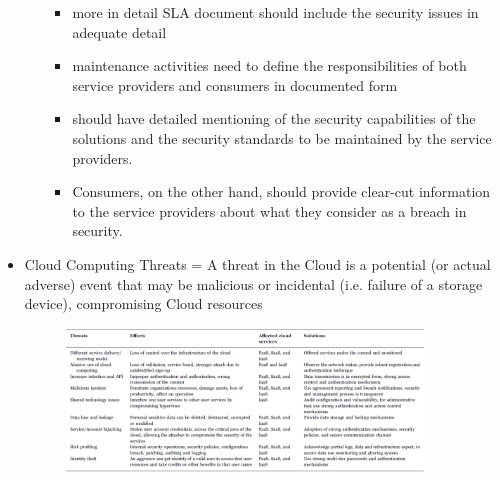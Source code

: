 \documentclass{article}
\begin{document}
\begin{itemize}
\begin{itemize}
        \begin{itemize}
            \item more in detail SLA document should include the security issues in adequate detail
            \item maintenance activities need to define the responsibilities of both service providers and consumers in documented form
            \item should have detailed mentioning of the security capabilities of the solutions and the security standards to be maintained by the service providers.
            \item Consumers, on the other hand, should provide clear-cut information to the service providers about what they consider as a breach in security.
        \end{itemize}
    \end{itemize}
    \item Cloud Computing Threats = A threat in the Cloud is a potential (or actual adverse) event that may be malicious or incidental (i.e. failure of a storage device), compromising Cloud resources
    \begin{figure}[h]
        \centering
        \includegraphics[width=0.90\textwidth]{figure/cloud_threats.png}
    \end{figure}

\end{itemize}
\end{document}
